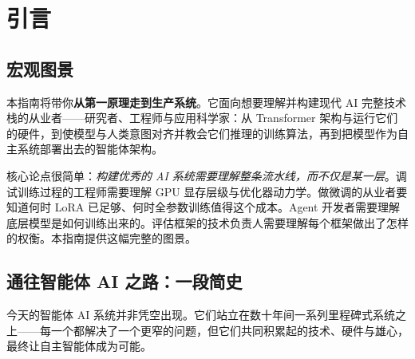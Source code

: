 \documentclass[11pt,a4paper,openany]{book}
\begin{document}
\chapter*{引言}
\label{introduction}

\section*{宏观图景}
\label{the-big-picture}

本指南将带你\textbf{从第一原理走到生产系统}。它面向想要理解并构建现代 AI 完整技术栈的从业者——研究者、工程师与应用科学家：从 Transformer 架构与运行它们的硬件，到使模型与人类意图对齐并教会它们推理的训练算法，再到把模型作为自主系统部署出去的智能体架构。

核心论点很简单：\emph{构建优秀的 AI 系统需要理解整条流水线，而不仅是某一层}。调试训练过程的工程师需要理解 GPU 显存层级与优化器动力学。做微调的从业者要知道何时 LoRA 已足够、何时全参数训练值得这个成本。Agent 开发者需要理解底层模型是如何训练出来的。评估框架的技术负责人需要理解每个框架做出了怎样的权衡。本指南提供这幅完整的图景。

\section*{通往智能体 AI 之路：一段简史}
\label{the-road-to-agentic-ai-a-brief-history}

今天的智能体 AI 系统并非凭空出现。它们站立在数十年间一系列里程碑式系统之上——每一个都解决了一个更窄的问题，但它们共同积累起的技术、硬件与雄心，最终让自主智能体成为可能。
\end{document}
